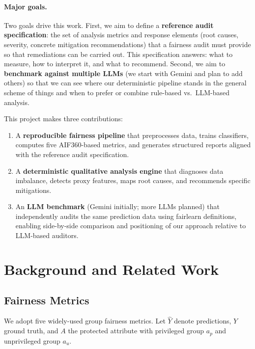 \documentclass[11pt,a4paper]{article}
\begin{document}
\paragraph{Major goals.}
Two goals drive this work. First, we aim to define a \textbf{reference
audit specification}: the set of analysis metrics and response elements
(root causes, severity, concrete mitigation recommendations) that a
fairness audit must provide so that remediations can be carried out. This
specification answers: what to measure, how to interpret it, and what to
recommend. Second, we aim to \textbf{benchmark against multiple LLMs} (we
start with Gemini and plan to add others) so that we can see where our
deterministic pipeline stands in the general scheme of things and when to
prefer or combine rule-based vs.\ LLM-based analysis.

This project makes three contributions:
\begin{enumerate}[nosep]
  \item A \textbf{reproducible fairness pipeline} that preprocesses data,
        trains classifiers, computes five AIF360-based metrics, and generates
        structured reports aligned with the reference audit specification.
  \item A \textbf{deterministic qualitative analysis engine} that diagnoses
        data imbalance, detects proxy features, maps root causes, and
        recommends specific mitigations.
  \item An \textbf{LLM benchmark} (Gemini initially; more LLMs planned) that
        independently audits the same prediction data using fairlearn
        definitions, enabling side-by-side comparison and positioning of our
        approach relative to LLM-based auditors.
\end{enumerate}

\section{Background and Related Work}

\subsection{Fairness Metrics}

We adopt five widely-used group fairness metrics. Let $\hat{Y}$ denote
predictions, $Y$ ground truth, and $A$ the protected attribute with
privileged group $a_p$ and unprivileged group $a_u$.
\end{document}
